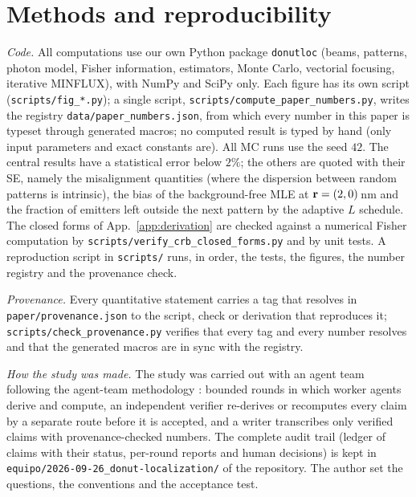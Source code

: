 \section{Methods and reproducibility}\label{sec:methods}

\emph{Code.} All computations use our own Python package \texttt{donutloc} (beams, patterns,
photon model, Fisher information, estimators, Monte Carlo, vectorial focusing, iterative
MINFLUX), with NumPy and SciPy only. Each figure has its own script
(\nolinkurl{scripts/fig_*.py}); a single script, \nolinkurl{scripts/compute_paper_numbers.py}, writes
the registry \nolinkurl{data/paper_numbers.json}, from which every number in this paper is typeset
through generated macros; no computed result is typed by hand (only input parameters and
exact constants are). All MC runs use the seed $42$. The central
results have a statistical error below $2\%$; the others are quoted with their SE, namely the
misalignment quantities (where the dispersion between random patterns is intrinsic), the bias
of the background-free MLE at $\mathbf{r}=(2,0)$\,nm and the fraction of
emitters left outside the next pattern by the adaptive $L$ schedule. The closed forms of
App.~\ref{app:derivation} are checked against a numerical Fisher computation by
\nolinkurl{scripts/verify_crb_closed_forms.py} and by unit tests. A reproduction script in
\nolinkurl{scripts/} runs, in order, the tests, the figures, the number registry and the provenance
check.

\emph{Provenance.} Every quantitative statement carries a tag that resolves in
\nolinkurl{paper/provenance.json} to the script, check or derivation that reproduces it;
\nolinkurl{scripts/check_provenance.py} verifies that every tag and every number resolves and that
the generated macros are in sync with the registry.

\emph{How the study was made.} The study was carried out with an agent team following the
agent-team methodology \cite{agentteam}: bounded rounds in which worker agents derive and
compute, an independent verifier re-derives or recomputes every claim by a separate route before
it is accepted, and a writer transcribes only verified claims with provenance-checked numbers.
The complete audit trail (ledger of claims with their status, per-round reports and human
decisions) is kept in \nolinkurl{equipo/2026-09-26_donut-localization/} of the repository. The
author set the questions, the conventions and the acceptance test.

